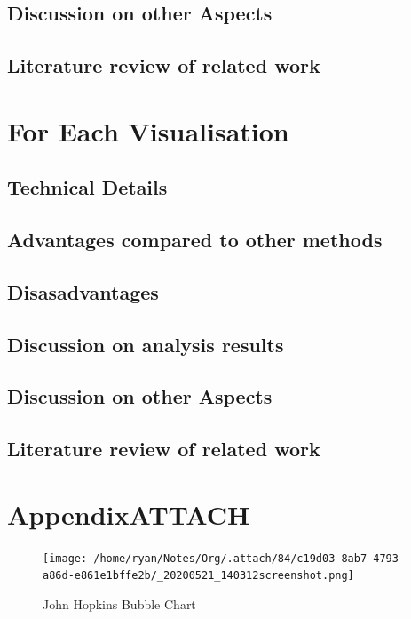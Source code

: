 \documentclass[11pt]{article}
\begin{document}
\subsection{Discussion on other Aspects}
\label{sec:org32ecb94}
\subsection{Literature review of related work}
\label{sec:orgcd93f11}

\section{For Each Visualisation}
\label{sec:org4a6cb1a}

\subsection{Technical Details}
\label{sec:org7edf61a}
\subsection{Advantages compared to other methods}
\label{sec:org46ae5e6}
\subsection{Disasadvantages}
\label{sec:org7de1a69}
\subsection{Discussion on analysis results}
\label{sec:orgb39d760}
\subsection{Discussion on other Aspects}
\label{sec:org8810b40}
\subsection{Literature review of related work}
\label{sec:org73d522d}

\section{Appendix\hfill{}\textsc{ATTACH}}
\label{sec:orgaf7bf29}
\begin{figure}[htbp]
\centering
\texttt{[image: /home/ryan/Notes/Org/.attach/84/c19d03-8ab7-4793-a86d-e861e1bffe2b/\_20200521\_140312screenshot.png]}
\caption{\label{fig:org412dc19}John Hopkins Bubble Chart \cite{2020o}}
\end{figure}
\end{document}
